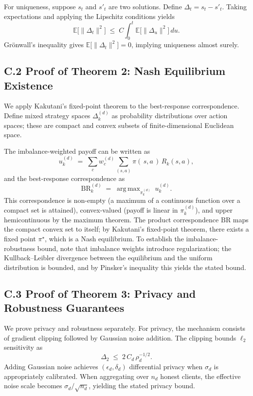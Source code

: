 \documentclass[12pt,a4paper]{article}
\theoremstyle{definition}
\DeclareMathOperator*{\argmax}{arg\,max}
\begin{document}
For uniqueness, suppose \(s_t\) and \(s'_t\) are two solutions. Define \(\Delta_t=s_t-s'_t\). Taking expectations and applying the Lipschitz conditions yields
\[
\mathbb{E}\big[\|\Delta_t\|^{2}\big] \;\le\; C\int_{0}^{t}\mathbb{E}\big[\|\Delta_u\|^{2}\big]\,du.
\]
Grönwall’s inequality gives \(\mathbb{E}\big[\|\Delta_t\|^{2}\big]=0\), implying uniqueness almost surely.

\endgroup

\subsection{C.2 Proof of Theorem 2: Nash Equilibrium Existence}

\begingroup
\setlength{\emergencystretch}{2em}

We apply Kakutani’s fixed-point theorem to the best-response correspondence. Define mixed strategy spaces \(\Delta_k^{(d)}\) as probability distributions over action spaces; these are compact and convex subsets of finite-dimensional Euclidean space.

The imbalance-weighted payoff can be written as
\[
u_k^{(d)} \;=\; \sum_{c} w_c^{(d)} \sum_{(s,a)} \pi(\,s,a\,)\,R_k(s,a),
\]
and the best-response correspondence as
\[
\mathrm{BR}_k^{(d)} \;=\; \argmax_{\pi_k^{(d)}} \; u_k^{(d)}.
\]
This correspondence is non-empty (a maximum of a continuous function over a compact set is attained), convex-valued (payoff is linear in \(\pi_k^{(d)}\)), and upper hemicontinuous by the maximum theorem. The product correspondence \(\mathrm{BR}\) maps the compact convex set to itself; by Kakutani’s fixed-point theorem, there exists a fixed point \(\pi^{\star}\), which is a Nash equilibrium. To establish the imbalance-robustness bound, note that imbalance weights introduce regularization; the Kullback–Leibler divergence between the equilibrium and the uniform distribution is bounded, and by Pinsker’s inequality this yields the stated bound.

\endgroup

\subsection{C.3 Proof of Theorem 3: Privacy and Robustness Guarantees}

\begingroup
\setlength{\emergencystretch}{2em}

We prove privacy and robustness separately. For privacy, the mechanism consists of gradient clipping followed by Gaussian noise addition. The clipping bounds \(\ell_2\) sensitivity as
\[
\Delta_{2}\;\le\;2\,C_d\,\rho_d^{-1/2}.
\]
Adding Gaussian noise achieves \((\epsilon_d,\delta_d)\) differential privacy when \(\sigma_d\) is appropriately calibrated. When aggregating over \(n_d\) honest clients, the effective noise scale becomes \(\sigma_d/\sqrt{n_d}\), yielding the stated privacy bound.
\end{document}
